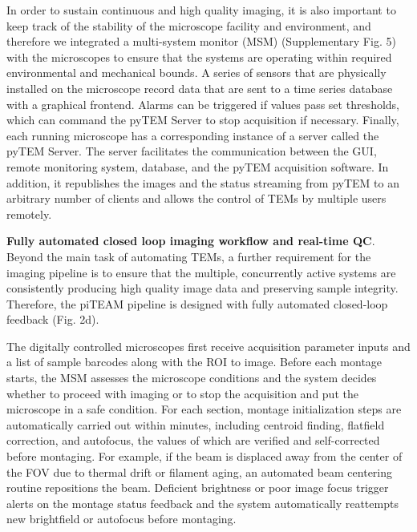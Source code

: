\documentclass{article}
\begin{document}
In order to sustain continuous and high quality imaging, it is also important to keep track of the stability of the microscope facility and environment, and therefore we integrated a multi-system monitor (MSM) (Supplementary Fig. 5) with the microscopes to ensure that the systems are operating within required environmental and mechanical bounds. A series of sensors that are physically installed on the microscope record data that are sent to a time series database with a graphical frontend. Alarms can be triggered if values pass set thresholds, which can command the pyTEM Server to stop acquisition if necessary. Finally, each running microscope has a corresponding instance of a server called the pyTEM Server. The server facilitates the communication between the GUI, remote monitoring system, database, and the pyTEM acquisition software. In addition, it republishes the images and the status streaming from pyTEM to an arbitrary number of clients and allows the control of TEMs by multiple users remotely.

\noindent\textbf{Fully automated closed loop imaging workflow and real-time QC}. Beyond the main task of automating TEMs, a further requirement for the imaging pipeline is to ensure that the multiple, concurrently active systems are consistently producing high quality image data and preserving sample integrity. Therefore, the piTEAM pipeline is designed with fully automated closed-loop feedback (Fig. 2d).

The digitally controlled microscopes first receive acquisition parameter inputs and a list of sample barcodes along with the ROI to image. Before each montage starts, the MSM assesses the microscope conditions and the system decides whether to proceed with imaging or to stop the acquisition and put the microscope in a safe condition. For each section, montage initialization steps are automatically carried out within minutes, including centroid finding, flatfield correction, and autofocus, the values of which are verified and self-corrected before montaging. For example, if the beam is displaced away from the center of the FOV due to thermal drift or filament aging, an automated beam centering routine repositions the beam. Deficient brightness or poor image focus trigger alerts on the montage status feedback and the system automatically reattempts new brightfield or autofocus before montaging.
\end{document}
